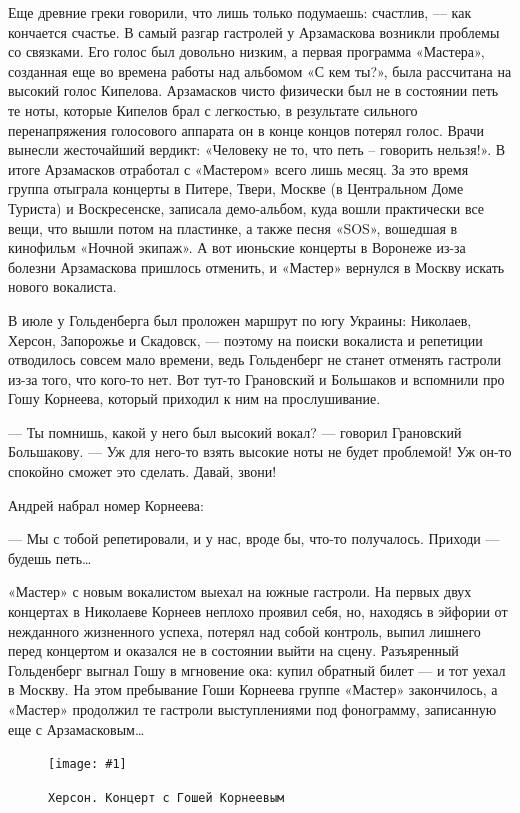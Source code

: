 \documentclass[10pt, twoside]{book}
\newcommand{\myincludegraphics}[1]{\texttt{[image: \#1]}}
\begin{document}
Еще древние греки говорили, что лишь только подумаешь: счастлив, — как кончается счастье. В самый разгар гастролей у
Арзамаскова возникли проблемы со связками. Его голос был довольно низким, а первая программа «Мастера», созданная еще во
времена работы над альбомом «С кем ты?», была рассчитана на высокий голос Кипелова. Арзамасков чисто физически был не в
состоянии петь те ноты, которые Кипелов брал с легкостью, в результате сильного перенапряжения голосового аппарата он в
конце концов потерял голос. Врачи вынесли жесточайший вердикт: «Человеку не то, что петь – говорить нельзя!». В итоге
Арзамасков отработал с «Мастером» всего лишь месяц. За это время группа отыграла концерты в Питере, Твери, Москве (в
Центральном Доме Туриста) и Воскресенске, записала демо-альбом, куда вошли практически все вещи, что вышли потом на
пластинке, а также песня «SOS», вошедшая в кинофильм «Ночной экипаж». А вот июньские концерты в Воронеже из-за болезни
Арзамаскова пришлось отменить, и «Мастер» вернулся в Москву искать нового вокалиста.

В июле у Гольденберга был проложен маршрут по югу Украины: Николаев, Херсон, Запорожье и Скадовск, — поэтому на поиски
вокалиста и репетиции отводилось совсем мало времени, ведь Гольденберг не станет отменять гастроли из-за того, что
кого-то нет. Вот тут-то Грановский и Большаков и вспомнили про Гошу Корнеева, который приходил к ним на прослушивание.

— Ты помнишь, какой у него был высокий вокал? — говорил Грановский Большакову. — Уж для него-то взять высокие ноты не
будет проблемой! Уж он-то спокойно сможет это сделать. Давай, звони!

Андрей набрал номер Корнеева:

— Мы с тобой репетировали, и у нас, вроде бы, что-то получалось. Приходи — будешь петь\ldots

«Мастер» с новым вокалистом выехал на южные гастроли. На первых двух концертах в Николаеве Корнеев неплохо проявил себя,
но, находясь в эйфории от нежданного жизненного успеха, потерял над собой контроль, выпил лишнего перед концертом и
оказался не в состоянии выйти на сцену. Разъяренный Гольденберг выгнал Гошу в мгновение ока: купил обратный билет — и
тот уехал в Москву. На этом пребывание Гоши Корнеева группе «Мастер» закончилось, а «Мастер» продолжил те гастроли
выступлениями под фонограмму, записанную еще с Арзамасковым\ldots

\begin{figure}[h]
    \centering
    \myincludegraphics{Image19}
    \caption{\texttt{Херсон. Концерт с Гошей Корнеевым}}
\end{figure}
\end{document}

